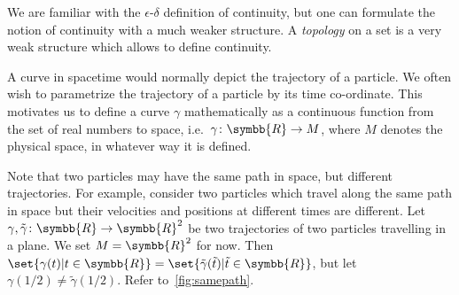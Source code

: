 \documentclass[a4 paper, 12pt]{book}
\theoremstyle{definition}
\newcommand{\rr}{\symbb{R}}
\begin{document}
    We are familiar with the \(\epsilon\)\nobreakdash-\(\delta\) definition of continuity, but one can formulate the notion of continuity with a much weaker structure. A \textit{topology} on a set is a very weak structure which allows to define continuity.

    A curve in spacetime would normally depict the trajectory of a particle. We often wish to parametrize the trajectory of a particle by its time co-ordinate. This motivates us to define a curve \(\gamma\) mathematically as a continuous function from the set of real numbers to space, i.e.\ \(\gamma \colon \rr \rightarrow M\), where \(M\) denotes the physical space, in whatever way it is defined.

    Note that two particles may have the same path in space, but different trajectories. For example, consider two particles which travel along the same path in space but their velocities and positions at different times are different. Let \(\gamma, \tilde\gamma \colon \rr \rightarrow \rr^2\) be two trajectories of two particles travelling in a plane. We set \(M = \rr^2\) for now. Then \(\set{\gamma(t) | t \in \rr} = \set{\tilde\gamma(\tilde t) | \tilde t \in \rr}\), but let \(\gamma(1/2) \neq \tilde\gamma(1/2)\). Refer to~\cref{fig:samepath}.
\end{document}
